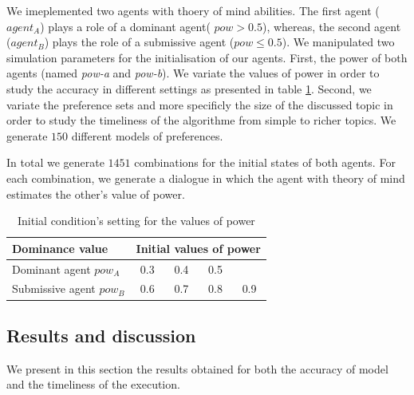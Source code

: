 \documentclass[sigconf]{aamas}  %
\begin{document}
	We imeplemented two agents with thoery of mind abilities.
	The first agent ($agent_A$) plays a role of a dominant agent( $pow > 0.5$), whereas, the second agent ($agent_B$) plays the role of a submissive agent ($pow \leq 0.5$). 
	We manipulated two simulation parameters for the initialisation of our agents. First, the power of both agents (named \emph{pow-a} and \emph{pow-b}). We variate the values of power in order to study the accuracy in different settings as presented in table \ref{tab:powsettings}.
	Second, we variate the preference sets and more specificly the size of the discussed topic in order to study the timeliness of the algorithme from simple to richer topics. We generate $150$ different models of preferences.
	
	In total we generate $1451$ combinations for the initial states of both agents. For each combination, we generate a dialogue in which the agent with theory of mind estimates the other's value of power.
	
	\begin{table}[t]
		\centering
		\begin{tabular}{|l|cccc|}
			\hline 
			\textbf{Dominance value } &	\multicolumn{4}{c|}{ Initial values of power } \\
			\hline
			Dominant agent $pow_A$ & 0.3 & 0.4 & 0.5 &  \\
			\hline
			Submissive agent $pow_B$ & 0.6 & 0.7 & 0.8 & 0.9\\
			\hline
		\end{tabular}
		\caption{Initial condition's setting for the values of power} 
		\label{tab:powsettings}
	\end{table}
	
	\subsection{Results and discussion}
	We present in this section the results obtained for both the accuracy of model and the timeliness of the execution.
	
\end{document}
